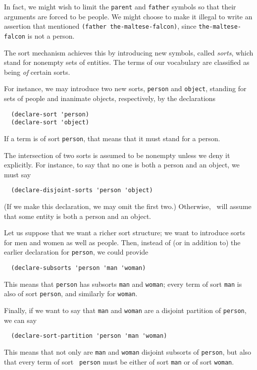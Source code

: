  In fact, we might
wish to limit the {\tt parent} and {\tt father} symbols so that their
arguments are forced to be people.  We might choose to make it illegal
to write an assertion that mentioned \verb|(father the-maltese-falcon)|,
since {\tt the-maltese-falcon} is not a person.

The sort mechanism achieves this by introducing new symbols, called {\em
sorts}, which stand for nonempty sets of entities.  The terms of our
vocabulary are classified as being {\em of} certain sorts.

For instance, we may introduce two new sorts, {\tt person} and
{\tt object}, standing for sets of people and inanimate objects,
respectively, by the declarations
\begin{verbatim}
  (declare-sort 'person)
  (declare-sort 'object)
\end{verbatim}
If a term is of sort \verb'person', that means that it must stand for a
person.

The intersection of two sorts is assumed to be nonempty unless we deny it
explicitly.  For instance, to say that no one is both a person and an object,
we must say
\begin{verbatim}
  (declare-disjoint-sorts 'person 'object)
\end{verbatim}
(If we make this declaration, we may omit the first two.) Otherwise, \snark\
will assume that some entity is both a person and an object.

Let us suppose that we want a richer sort structure; we want to
introduce sorts for men and women as well as people.  Then, instead of
(or in addition to) the earlier declaration for {\tt person}, we could
provide
\begin{verbatim}
  (declare-subsorts 'person 'man 'woman)
\end{verbatim}
This means that {\tt person} has subsorts {\tt man} and {\tt woman};
every term of sort {\tt man} is also of sort {\tt person}, and
similarly for {\tt woman}.

Finally, if we want to say that {\tt man} and {\tt woman} are a
disjoint partition of {\tt person}, we can say
\begin{verbatim}
  (declare-sort-partition 'person 'man 'woman)
\end{verbatim}
This means that not only are {\tt man} and {\tt woman} disjoint
subsorts of {\tt person}, but also that every term of sort {\tt
person} must be either of sort {\tt man} or of sort {\tt woman}.

